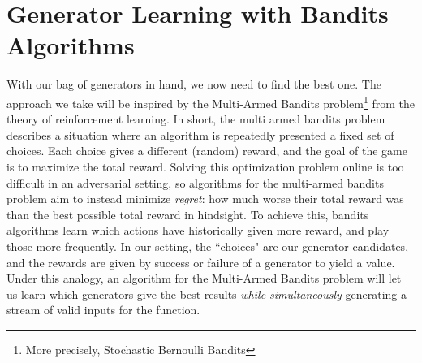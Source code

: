 \documentclass[sigconf,nonacm,review,anonymous]{acmart}
\newtheorem{definition}{Definition}
\DeclareMathOperator*{\argmax}{arg\,max}
\begin{document}
\section{Generator Learning with Bandits Algorithms}
\label{sec:bandits}
With our bag of generators in hand, we now need to find the best one. The
approach we take will be inspired by the Multi-Armed Bandits
\cite{gittins1979bandit} problem\footnote{More precisely, Stochastic Bernoulli
Bandits} from the theory of reinforcement learning. In short, the multi armed
bandits problem describes a situation where an algorithm is repeatedly presented
a fixed set of choices. Each choice gives a different (random) reward, and the
goal of the game is to maximize the total reward. Solving this optimization problem
online is too difficult in an adversarial setting, so algorithms for the multi-armed
bandits problem aim to instead minimize \emph{regret}: how much worse their total reward
was than the best possible total reward in hindsight. To achieve this, bandits algorithms
learn which actions have historically given more reward, and play those more frequently.
In our setting, the ``choices" are our
generator candidates, and the rewards are given by success or failure of a
generator to yield a value. Under this analogy, an algorithm for the Multi-Armed
Bandits problem will let us learn which generators give the best results
\textit{while simultaneously} generating a stream of valid inputs for the
function.



\end{document}
